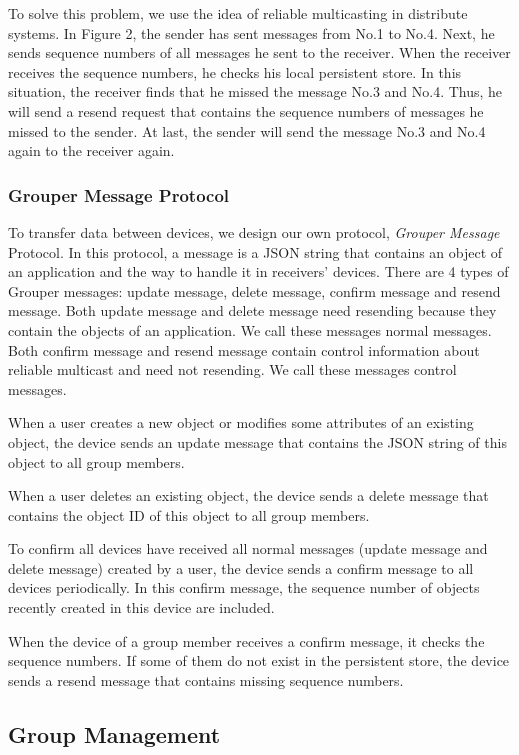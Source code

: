 \documentclass[twocolumn,10pt]{article}
\begin{document}
To solve this problem, we use the idea of reliable multicasting in distribute systems. 
In Figure 2, the sender has sent messages from No.1 to No.4. 
Next, he sends sequence numbers of all messages he sent to the receiver. 
When the receiver receives the sequence numbers, he checks his local persistent store. 
In this situation, the receiver finds that he missed the message No.3 and No.4. 
Thus, he will send a resend request that contains the sequence numbers of messages he missed to the sender. 
At last, the sender will send the message No.3 and No.4 again to the receiver again.

\subsubsection{Grouper Message Protocol}

To transfer data between devices, we design our own protocol, \emph{Grouper Message} Protocol. 
In this protocol, a message is a JSON string that contains an object of an application and the way to handle it in receivers’ devices. 
There are 4 types of Grouper messages: update message, delete message, confirm message and resend message. 
Both update message and delete message need resending because they contain the objects of an application. 
We call these messages normal messages. 
Both confirm message and resend message contain control information about reliable multicast and need not resending. 
We call these messages control messages.

When a user creates a new object or modifies some attributes of an existing object, the device sends an update message that contains the JSON string of this object to all group members.

When a user deletes an existing object, the device sends a delete message that contains the object ID of this object to all group members.

To confirm all devices have received all normal messages (update message and delete message) created by a user, the device sends a confirm message to all devices periodically. 
In this confirm message, the sequence number of objects recently created in this device are included.

When the device of a group member receives a confirm message, it checks the sequence numbers. 
If some of them do not exist in the persistent store, the device sends a resend message that contains missing sequence numbers.

\subsection{Group Management}
\end{document}
